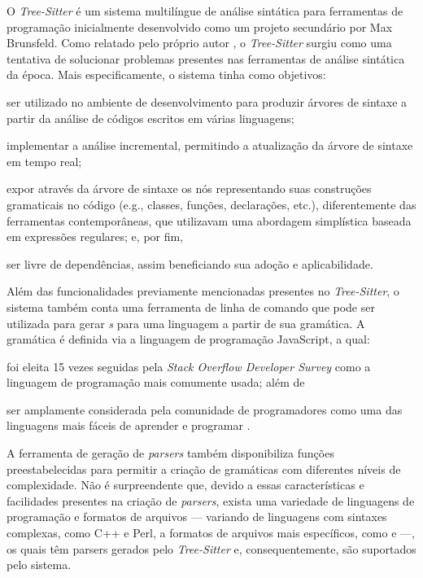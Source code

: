 \documentclass
  [11pt,a4paper,english,brazil,openright,sumario=tradicional,twoside]
  {abntex2}
\newcommand{\treesitter}{\textit{Tree-Sitter}\xspace}
\begin{document}
  O \treesitter é um sistema multilíngue de análise sintática para ferramentas
  de programação inicialmente desenvolvido como um projeto secundário por Max
  Brunsfeld. Como relatado pelo próprio autor \cite{github-2017-tree}, o
  \treesitter surgiu como uma tentativa de solucionar problemas presentes nas
  ferramentas de análise sintática da época. Mais especificamente, o sistema
  tinha como objetivos:
  \begin{inparaenum}
    \item ser utilizado no ambiente de desenvolvimento para produzir árvores de
          sintaxe a partir da análise de códigos escritos em várias linguagens;
    \item implementar a análise incremental, permitindo a atualização da árvore
          de sintaxe em tempo real;
    \item expor através da árvore de sintaxe os nós representando suas
          construções gramaticais no código (e.g., classes, funções,
          declarações, etc.), diferentemente das ferramentas contemporâneas,
          que utilizavam uma abordagem simplística baseada em expressões
          regulares; e, por fim,
    \item ser livre de dependências, assim beneficiando sua adoção e
          aplicabilidade.
  \end{inparaenum}

  Além das funcionalidades previamente mencionadas presentes no \treesitter, o
  sistema também conta uma ferramenta de linha de comando que pode ser
  utilizada para gerar \textit{s} para uma linguagem a partir de
  sua gramática. A gramática é definida via a linguagem de programação
  JavaScript, a qual:
  \begin{inparaenum}
    \item foi eleita 15 vezes seguidas pela
          \textit{Stack Overflow Developer Survey}
          \cite{stack-overflow-2022-stack} como a linguagem de programação mais
          comumente usada; além de
    \item ser amplamente considerada pela comunidade de programadores como uma
          das linguagens mais fáceis de aprender e programar
          \cites{berkeley-2023-11}{goel-2023-how}{w3schools-2023-javascript}.
  \end{inparaenum}
  A ferramenta de geração de \textit{parsers} também disponibiliza funções
  preestabelecidas para permitir a criação de gramáticas com diferentes níveis
  de complexidade. Não é surpreendente que, devido a essas características e
  facilidades presentes na criação de \textit{parsers}, exista uma variedade de
  linguagens de programação e formatos de arquivos --- variando de linguagens
  com sintaxes complexas, como C++ e Perl, a formatos de arquivos mais
  específicos, como  e  ---,
  os quais têm parsers gerados pelo \treesitter e, consequentemente, são
  suportados pelo sistema.
\end{document}
